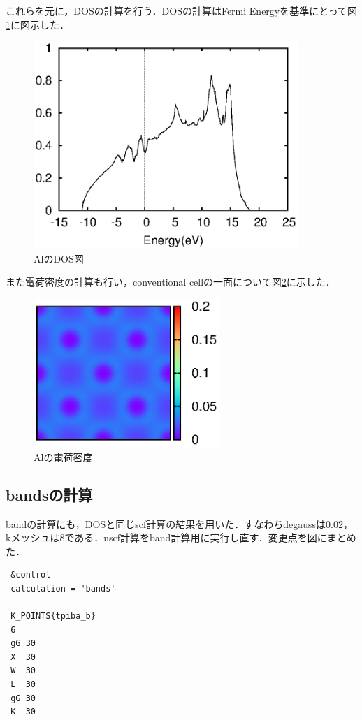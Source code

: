 \documentclass[a4j]{jarticle}
\begin{document}
これらを元に，DOSの計算を行う．DOSの計算はFermi Energyを基準にとって図\ref{035614_19May19}に図示した．
\begin{figure}[htb]
 \begin{center}
  \includegraphics[width=10cm]{Al.dos.eps}
  \caption{AlのDOS図}
  \label{035614_19May19}
 \end{center}
\end{figure}

また電荷密度の計算も行い，conventional cellの一面について図\ref{054539_19May19}に示した．
\begin{figure}[htb]
 \begin{center}
  \includegraphics[width=7cm]{charge.eps}
  \caption{Alの電荷密度}
  \label{054539_19May19}
 \end{center}
\end{figure}
\newpage


\subsection{bandsの計算}
bandの計算にも，DOSと同じscf計算の結果を用いた．すなわちdegaussは0.02，kメッシュは8である．nscf計算をband計算用に実行し直す．変更点を図にまとめた．

\begin{lstlisting}
 &control
 calculation = 'bands'

 K_POINTS{tpiba_b}
 6
 gG 30
 X  30
 W  30
 L  30
 gG 30
 K  30
\end{lstlisting}
\end{document}
